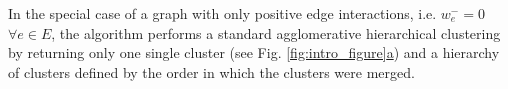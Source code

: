  In the special case of a graph with only positive edge interactions, i.e. $w_e^-=0$ $\forall e\in E$, %
 the algorithm performs a standard agglomerative hierarchical clustering by returning only one single cluster (see Fig. \hyperref[fig:intro_figure]{\ref*{fig:intro_figure}a}) and a hierarchy of clusters defined by the order in which the clusters were merged. 





